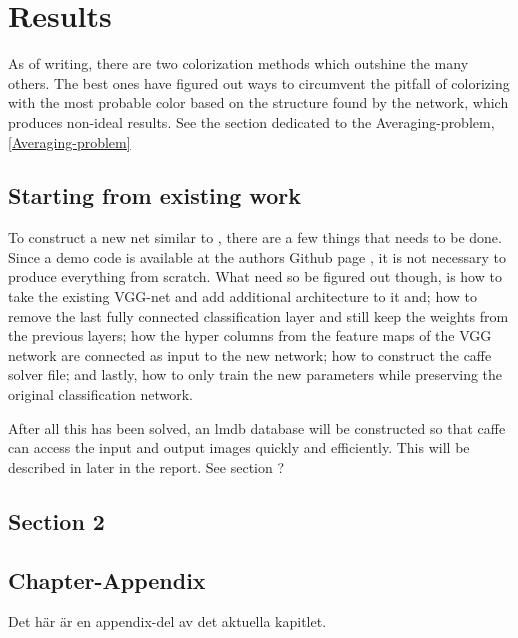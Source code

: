 \chapter{Results}\label{cha:Research}
%
As of writing, there are two colorization methods which outshine the many others. The best ones have figured out ways to circumvent the pitfall of colorizing with the most probable color based on the structure found by the network, which produces non-ideal results. See the section dedicated to the Averaging-problem, \ref{Averaging-problem}

\section{Starting from existing work}\label{sec:research:history}
To construct a new net similar to \citep{larsson2016learning}, there are a few things that needs to be done. Since a demo code is available at the authors Github page \citep{LarssonGithub}, it is not necessary to produce everything from scratch. What need so be figured out though, is how to take the existing VGG-net and add additional architecture to it and; how to remove the last fully connected classification layer and still keep the weights from the previous layers; how the hyper columns from the feature maps of the VGG network are connected as input to the new network; how to construct the caffe solver file; and lastly, how to only train the new parameters while preserving the original classification network. 

After all this has been solved, an lmdb database will be constructed so that caffe can access the input and output images quickly and efficiently. This will be described in later in the report. See section ?

\section{Section 2}

\begin{chapter-appendix}

\section{Chapter-Appendix}
%
Det här är en appendix-del av det aktuella kapitlet.

\end{chapter-appendix}
